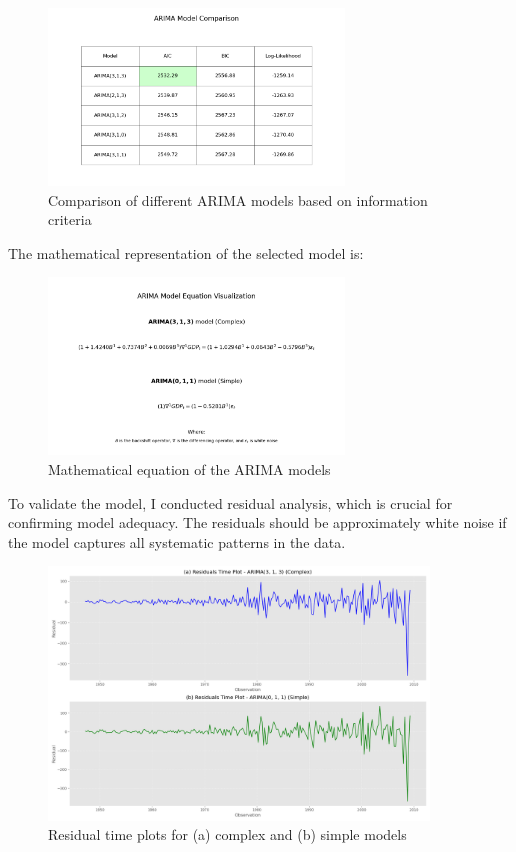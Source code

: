 \documentclass[11pt,a4paper]{article}
\begin{document}
\begin{figure}[H]
    \centering
    \includegraphics[width=0.7\textwidth]{plots/arima/gdp/model_comparison_table.png}
    \caption{Comparison of different ARIMA models based on information criteria}
    \label{fig:model_comparison}
\end{figure}

The mathematical representation of the selected model is:

\begin{figure}[H]
    \centering
    \includegraphics[width=0.7\textwidth]{plots/arima/gdp/model_equation.png}
    \caption{Mathematical equation of the ARIMA models}
    \label{fig:model_equation}
\end{figure}

To validate the model, I conducted residual analysis, which is crucial for confirming model adequacy. The residuals should be approximately white noise if the model captures all systematic patterns in the data.

\begin{figure}[H]
    \centering
    \includegraphics[width=0.9\textwidth]{plots/arima/gdp/figure3_residual_comparison.png}
    \caption{Residual time plots for (a) complex and (b) simple models}
    \label{fig:residual_plots}
\end{figure}
\end{document}
